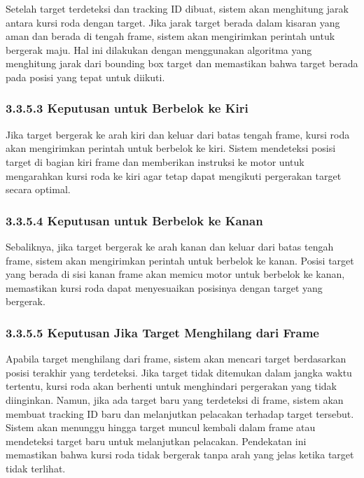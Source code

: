 Setelah target terdeteksi dan tracking ID dibuat, sistem akan menghitung jarak antara kursi roda dengan target. Jika jarak target berada dalam kisaran yang aman dan berada di tengah frame, sistem akan mengirimkan perintah untuk bergerak maju. Hal ini dilakukan dengan menggunakan algoritma yang menghitung jarak dari bounding box target dan memastikan bahwa target berada pada posisi yang tepat untuk diikuti.

\subsubsection{3.3.5.3 Keputusan untuk Berbelok ke Kiri}
\label{subsubsec:keputusan_belok_kiri}

Jika target bergerak ke arah kiri dan keluar dari batas tengah frame, kursi roda akan mengirimkan perintah untuk berbelok ke kiri. Sistem mendeteksi posisi target di bagian kiri frame dan memberikan instruksi ke motor untuk mengarahkan kursi roda ke kiri agar tetap dapat mengikuti pergerakan target secara optimal.

\subsubsection{3.3.5.4 Keputusan untuk Berbelok ke Kanan}
\label{subsubsec:keputusan_belok_kanan}

Sebaliknya, jika target bergerak ke arah kanan dan keluar dari batas tengah frame, sistem akan mengirimkan perintah untuk berbelok ke kanan. Posisi target yang berada di sisi kanan frame akan memicu motor untuk berbelok ke kanan, memastikan kursi roda dapat menyesuaikan posisinya dengan target yang bergerak.

\subsubsection{3.3.5.5 Keputusan Jika Target Menghilang dari Frame}
\label{subsubsec:keputusan_target_menghilang}

Apabila target menghilang dari frame, sistem akan mencari target berdasarkan posisi terakhir yang terdeteksi. Jika target tidak ditemukan dalam jangka waktu tertentu, kursi roda akan berhenti untuk menghindari pergerakan yang tidak diinginkan. Namun, jika ada target baru yang terdeteksi di frame, sistem akan membuat tracking ID baru dan melanjutkan pelacakan terhadap target tersebut. Sistem akan menunggu hingga target muncul kembali dalam frame atau mendeteksi target baru untuk melanjutkan pelacakan. Pendekatan ini memastikan bahwa kursi roda tidak bergerak tanpa arah yang jelas ketika target tidak terlihat.

